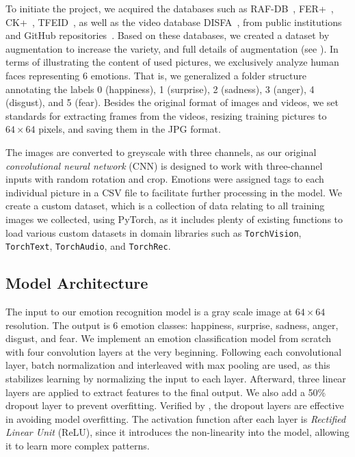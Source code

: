 To initiate the project, %
we acquired the databases such as RAF-DB~\cite{li_reliable_2017,li2019reliable}, 
FER+~\cite{BarsoumZCZ16}, CK+~\cite{LuceyCKSAM10}, TFEID~\cite{tfeid,LiGL22}, 
as well as the video database DISFA~\cite{MavadatiMBTC13}, 
from public institutions and GitHub repositories~\cite{cs229_2023}. 
Based on these databases, we created a dataset by augmentation to increase the variety, 
and full details of augmentation (see ). 
In terms of illustrating the content of used pictures, we exclusively analyze human faces representing 6 emotions. 
That is, 
we generalized a folder structure annotating the labels 0 (happiness), 1 (surprise), 2 (sadness), 3 (anger), 4 (disgust), and 5 (fear). 
Besides the original format of images and videos, we set standards for extracting frames from the videos, 
resizing training pictures to $64\times 64$ pixels, and saving them in the JPG format.


The images are converted to greyscale with three channels, 
as our original \textit{convolutional neural network} (CNN) is designed to work with three-channel inputs with random rotation and crop. 
Emotions were assigned tags to each individual picture in a CSV file to facilitate further processing in the model.
We create a custom dataset, which is a collection of data relating to all training images we collected, 
using PyTorch, 
as it includes plenty of existing functions to load various custom datasets in domain libraries such as \texttt{TorchVision}, \texttt{TorchText}, \texttt{TorchAudio}, and \texttt{TorchRec}.

\subsection{Model Architecture}
The input to our emotion recognition model is a gray scale image at $64 \times 64 $ resolution. 
The output is 6 emotion classes: happiness, surprise, sadness, anger, disgust, and fear. 
We implement an emotion classification model from scratch with four convolution layers at the very beginning. 
Following each convolutional layer, 
batch normalization and interleaved with max pooling are used, 
as this stabilizes learning by normalizing the input to each layer. 
Afterward, three linear layers are applied to extract features to the final output. 
We also add a 50\% dropout layer to prevent overfitting. 
Verified by \citet{BarsoumZCZ16}, 
the dropout layers are effective in avoiding model overfitting. 
The activation function after each layer is \textit{Rectified Linear Unit} (ReLU), 
since it introduces the non-linearity into the model, 
allowing it to learn more complex patterns. 

